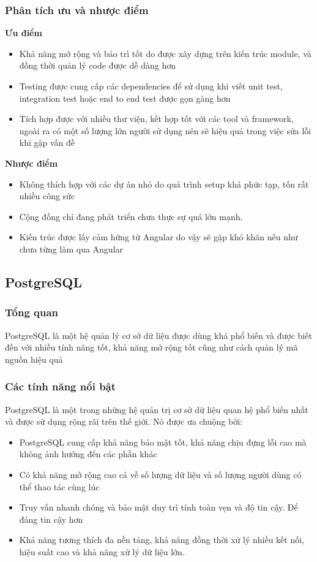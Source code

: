 \subsubsection{Phân tích ưu và nhược điểm}
\textbf{Ưu điểm}
\begin{itemize}
    \item Khả năng mở rộng và bảo trì tốt do được xây dựng trên kiến trúc module, và đồng thời quản lý code được dễ dàng hơn
    \item Testing được cung cấp các dependencies để sử dụng khi viết unit test, integration test hoặc end to end test được gọn gàng hơn
    \item Tích hợp được với nhiều thư viện, kết hợp tốt với các tool và framework, ngoài ra có một số lượng lớn người sử dụng nên sẽ hiệu quả trong việc sửa lỗi khi gặp vấn đề
\end{itemize}
\textbf{Nhược điểm}
\begin{itemize}
    \item Không thích hợp với các dự án nhỏ do quá trình setup khá phức tạp, tốn rất nhiều công sức
    \item Cộng đồng chỉ đang phát triển chưa thực sự quá lớn mạnh.
    \item Kiến trúc được lấy cảm hứng từ Angular do vậy sẽ gặp khó khăn nếu như chưa từng làm qua Angular
\end{itemize}
\subsection{PostgreSQL}
\subsubsection{Tổng quan}
PostgreSQL là một hệ quản lý cơ sở dữ liệu được dùng khá phổ biến và được biết đến với nhiều tính năng tốt, khả năng mở rộng tốt cũng như cách quản lý mã nguồn hiệu quả
\subsubsection{Các tính năng nổi bật}
PostgreSQL là một trong những hệ quản trị cơ sở dữ liệu quan hệ phổ biến nhất và được sử
dụng rộng rãi trên thế giới. Nó được ưa chuộng bởi: 
\begin{itemize}
    \item PostgreSQL cung cấp khả năng bảo mật tốt, khả năng chịu đựng lỗi cao mà không ảnh hưởng đến các phần khác 
    \item Có khả năng mở rộng cao cả về số lượng dữ liệu và số lượng người dùng có thể thao tác cùng lúc
    \item Truy vấn nhanh chóng và bảo mật duy trì tính toàn vẹn và độ tin cậy. Để đáng tin cậy hơn
    \item Khả năng tương thích đa nền tảng, khả năng đồng thời xử lý nhiều kết nối, hiệu suất cao và khả năng xử lý dữ liệu lớn.
\end{itemize}
